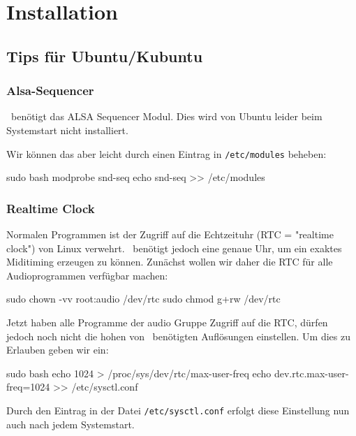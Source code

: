 \chapter{Installation}
  \section{Tips für Ubuntu/Kubuntu}

    \subsection{Alsa-Sequencer}

      \M\ benötigt das ALSA Sequencer Modul. Dies wird von Ubuntu leider
      beim Systemstart nicht installiert.

      Wir können das aber leicht durch einen Eintrag in {\tt /etc/modules}
      beheben:

      \starttyping
            sudo bash
            modprobe snd-seq
            echo snd-seq >> /etc/modules
      \stoptyping


    \subsection{Realtime Clock}

      Normalen Programmen ist der Zugriff auf die Echtzeituhr 
      (RTC = "realtime clock") von Linux
      verwehrt. \M\ benötigt jedoch eine genaue Uhr, um ein exaktes
      Miditiming erzeugen zu können.
      Zunächst wollen wir daher die RTC für alle Audioprogrammen
      verfügbar machen:

      \starttyping
            sudo chown -vv root:audio /dev/rtc
            sudo chmod g+rw /dev/rtc
      \stoptyping

      Jetzt haben alle Programme der audio Gruppe Zugriff auf die
      RTC, dürfen jedoch noch nicht die hohen von \M\ benötigten
      Auflösungen einstellen.
      Um dies zu Erlauben geben wir ein:

      
      \starttyping
            sudo bash
            echo 1024 > /proc/sys/dev/rtc/max-user-freq
            echo dev.rtc.max-user-freq=1024 >> /etc/sysctl.conf
      \stoptyping

      Durch den Eintrag in der Datei {\tt /etc/sysctl.conf} erfolgt diese
      Einstellung nun auch nach jedem Systemstart.
